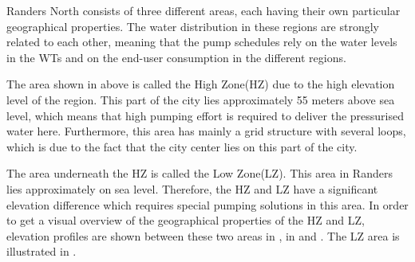 Randers North consists of three different areas, each having their own particular geographical properties. The water distribution in these regions are strongly related to each other, meaning that the pump schedules rely on the water levels in the WTs and on the end-user consumption in the different regions. 

The area shown in  above is called the High Zone(HZ) due to the high elevation level of the region. This part of the city lies approximately 55 meters above sea level, which means that high pumping effort is required to deliver the pressurised water here. Furthermore, this area has mainly a grid structure with several loops, which is due to the fact that the city center lies on this part of the city.  

The area underneath the HZ is called the Low Zone(LZ). This area in Randers lies approximately on sea level. Therefore, the HZ and LZ have a significant elevation difference which requires special pumping solutions in this area. In order to get a visual overview of the geographical properties of the HZ and LZ, elevation profiles are shown between these two areas in , in  and . The LZ area is illustrated in .

